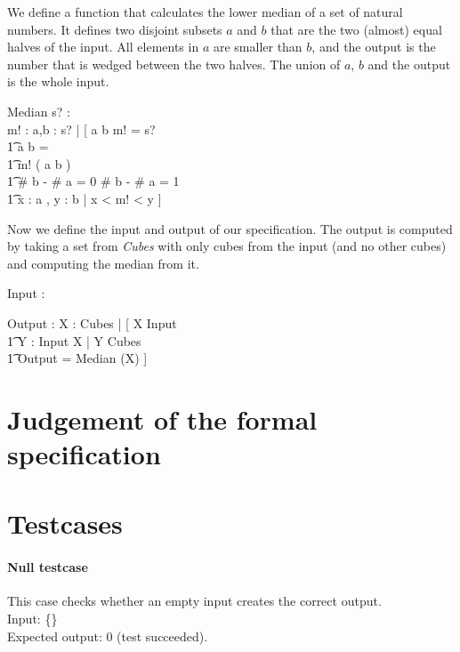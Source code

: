 \documentclass[12pt]{article}
\begin{document}
We define a function that calculates the lower median of a set of natural numbers. It defines two disjoint subsets $a$ and $b$ that are the two (almost) equal halves of the input. All elements in $a$ are smaller than $b$, and the output is the number that is wedged between the two halves. The union of $a$, $b$ and the output is the whole input.
\begin{schema}{Median}
s? : \power \nat \\
m! : \nat
\where
\exists a,b : \power s? | [ \: a \union b \union m! = s? \\
                          \t1 a \cap b = \emptyset \\
                          \t1 m! \notin ( a \union b ) \\
                          \t1 \# b - \# a = 0 \: \vee \# b - \# a = 1 \\
                          \t1 \forall x : a , y : b | x < m! < y \: ]
\end{schema}

Now we define the input and output of our specification. The output is computed by taking a set from \textsl{Cubes} with only cubes from the input (and no other cubes) and computing the median from it.
\begin{axdef}
Input : \seq \nat
\end{axdef}

\begin{axdef}
Output : \nat
\where
\exists X : Cubes | [ \: X \subseteq \ran Input \\ \t1 \forall Y : \ran Input \setminus X | Y \not\subseteq Cubes \\ \t1 Output = Median (X) \: ]
\end{axdef}

\section{Judgement of the formal specification}

\section{Testcases}

\paragraph{Null testcase}
This case checks whether an empty input creates the correct output. \\
Input: \{\} \\
Expected output: 0 (test succeeded).
\end{document}
